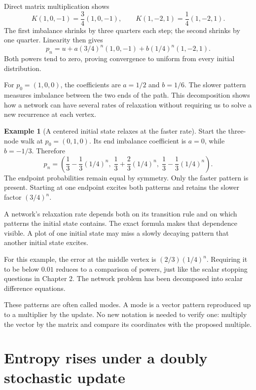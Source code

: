 \documentclass[11pt,oneside,openany]{book}
\theoremstyle{definition}
\newtheorem{example}{Example}[chapter]
\theoremstyle{remark}
\numberwithin{equation}{chapter}
\begin{document}
Direct matrix multiplication shows \[K(1,0,-1)=\frac34(1,0,-1),\qquad
K(1,-2,1)=\frac14(1,-2,1).\] The first imbalance shrinks by three quarters each step; the second shrinks by one quarter. Linearity then gives \[\boxed{
p_n=u+a(3/4)^n(1,0,-1)+b(1/4)^n(1,-2,1).
}\] Both powers tend to zero, proving convergence to uniform from every initial distribution.

For \(p_0=(1,0,0)\), the coefficients are \(a=1/2\) and \(b=1/6\). The slower pattern measures imbalance between the two ends of the path. This decomposition shows how a network can have several rates of relaxation without requiring us to solve a new recurrence at each vertex.

\begin{example}[A centered initial state relaxes at the faster rate]

Start the three-node walk at \(p_0=(0,1,0)\). Its end imbalance coefficient is \(a=0\), while \(b=-1/3\). Therefore \[p_n=\left(\frac13-\frac13(1/4)^n,\;
\frac13+\frac23(1/4)^n,\;
\frac13-\frac13(1/4)^n\right).\] The endpoint probabilities remain equal by symmetry. Only the faster pattern is present. Starting at one endpoint excites both patterns and retains the slower factor \((3/4)^n\).

\end{example}

A network's relaxation rate depends both on its transition rule and on which patterns the initial state contains. The exact formula makes that dependence visible. A plot of one initial state may miss a slowly decaying pattern that another initial state excites.

For this example, the error at the middle vertex is \((2/3)(1/4)^n\). Requiring it to be below \(0.01\) reduces to a comparison of powers, just like the scalar stopping questions in Chapter 2. The network problem has been decomposed into scalar difference equations.

These patterns are often called modes. A mode is a vector pattern reproduced up to a multiplier by the update. No new notation is needed to verify one: multiply the vector by the matrix and compare its coordinates with the proposed multiple.

\section{Entropy rises under a doubly stochastic update}\label{ch10-entropy-rises-under-a-doubly-stochastic-update}
\end{document}
